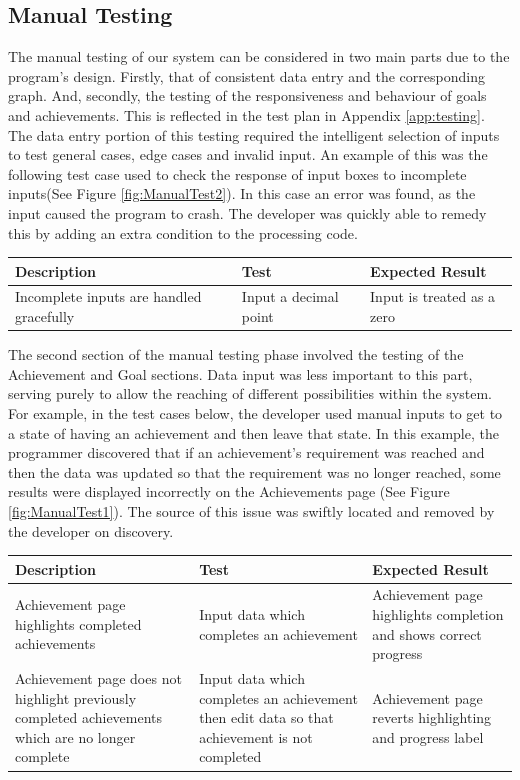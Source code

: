 \documentclass[11pt]{article}
\begin{document}
\subsection{Manual Testing}
The manual testing of our system can be considered in two main parts due to 
the program's design. Firstly, that of consistent data entry and the 
corresponding graph. And, secondly, the testing of the responsiveness and 
behaviour of goals and achievements. This is reflected in the test plan in 
Appendix \ref{app:testing}. The data entry portion of this testing required 
the intelligent selection of inputs to test general cases, edge cases and 
invalid input. An example of this was the following test case used to check 
the response of input boxes to incomplete inputs(See Figure \ref{fig:ManualTest2}). 
In this case an error was found, as the input caused the program to crash. 
The developer was quickly able to remedy this by adding an extra condition 
to the processing code.
\begin{center}
    \begin{tabular}{|p{5cm}|p{5cm}|p{5cm}|}
        \hline
        \textbf{Description} & \textbf{Test} & \textbf{Expected Result}\\
        \hline
        Incomplete inputs are handled gracefully 
        & Input a decimal point 
        & Input is treated as a zero\\
        \hline
    \end{tabular}
\end{center}
The second section of the manual testing phase involved the testing of the 
Achievement and Goal sections. Data input was less important to this part, 
serving purely to allow the reaching of different possibilities within the 
system. For example, in the test cases below, the developer used manual 
inputs to get to a state of having an achievement and then leave that state. 
In this example, the programmer discovered that if an achievement's 
requirement was reached and then the data was updated so that the requirement 
was no longer reached, some results were displayed incorrectly on the 
Achievements page (See Figure \ref{fig:ManualTest1}). The source of this issue 
was swiftly located and removed by the developer on discovery.\par
\begin{center}
    \begin{tabular}{|p{5cm}|p{5cm}|p{5cm}|}
        \hline
        \textbf{Description} & \textbf{Test} & \textbf{Expected Result}\\
        \hline
        Achievement page highlights completed achievements & Input data which 
        completes an achievement & Achievement page highlights completion and 
        shows correct progress \\
        \hline
        Achievement page does not highlight previously completed achievements 
        which are no longer complete & Input data which completes an achievement 
        then edit data so that achievement is not completed & Achievement page 
        reverts highlighting and progress label\\
        \hline
    \end{tabular}
\end{center}
\end{document}
